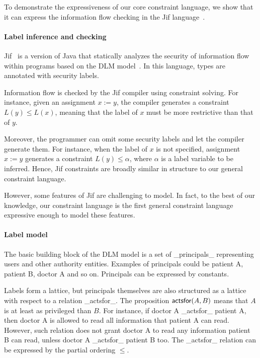 To demonstrate the expressiveness of our core constraint language, we
show that it can express the information flow checking in 
the Jif language~\cite{jif}.

\paragraph{Label inference and checking}

Jif~\cite{jif} is a version of Java that statically analyzes the security of
information flow within programs based on the DLM model~\cite{ml-ifc-97}. In
this language, types are annotated with security labels.

Information flow is checked by the Jif compiler using constraint
solving. For instance, given an assignment $x := y$, the compiler
generates a constraint $L(y)\leq L(x)$, meaning that the
label of $x$ must be more restrictive than that of $y$.

Moreover, the programmer can omit some security labels and let the
compiler generate them. For instance, when the label of
$x$ is not specified, assignment $x := y$ generates a constraint
$L(y)\leq \alpha$, where $\alpha$ is a label variable to be inferred.
Hence, Jif constraints are broadly similar in structure
to our general constraint language.

However, some features of Jif are challenging to model.  In fact, to
the best of our knowledge, our constraint language is the first
general constraint language expressive enough to model these features.

\paragraph{Label model}

The basic building block of the DLM model is a set of _principals_
representing users and other authority entities. Examples of
principals could be patient A, patient B, doctor A and so on.
Principals can be expressed by constants.

Labels form a lattice, but principals themselves are also structured
as a lattice with respect to a relation _actsfor_.  The proposition
$\textsf{actsfor}(A,B)$ means that $A$ is at least as privileged than
$B$.
% 
For instance, if doctor A _actsfor_ patient A, then doctor A is
allowed to read all information that patient A can read. However, such
relation does not grant doctor A to read any information patient B can
read, unless doctor A _actsfor_ patient B too. The _actsfor_ relation
can be expressed by the partial ordering $\leq$.

